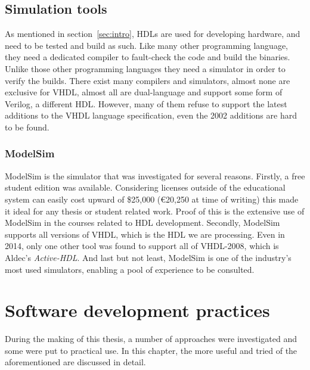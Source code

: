 \documentclass[11pt,british]{article}
\begin{document}

\subsection{Simulation tools}
\label{subsec:simtool}
As mentioned in section~\ref{sec:intro}, \gls{HDL}s are used for developing hardware, and need to be tested and build as such. Like many other programming language, they need a dedicated compiler to fault-check the code and build the binaries. Unlike those other programming languages they need a simulator in order to verify the builds. There exist many compilers and simulators, almost none are exclusive for \gls{VHDL}, almost all are dual-language and support some form of Verilog, a different HDL. However, many of them refuse to support the latest additions to the VHDL language specification, even the 2002 additions are hard to be found.\cite{ActiveHDL,Cadence,ISE,Quartus}

\subsubsection{ModelSim}
ModelSim is the simulator that was investigated for several reasons. Firstly, a free student edition was available. Considering licenses  outside of the educational system can easily cost upward of \$25,000 (\euro20,250 at time of writing) this made it ideal for any thesis or student related work. Proof of this is the extensive use of ModelSim in the courses related to HDL development. Secondly, ModelSim supports all versions of \gls{VHDL}, which is the \gls{HDL} we are processing. Even in 2014, only one other tool was found to support all of VHDL-2008, which is Aldec's \emph{Active-HDL}. And last but not least, ModelSim is one of the industry's most used simulators, enabling a pool of experience to be consulted.\cite{ModelSim}


\newpage{}
\section{Software development practices}
During the making of this thesis, a number of approaches were investigated and some were put to practical use. In this chapter, the more useful and tried of the aforementioned are discussed in detail.
\end{document}
